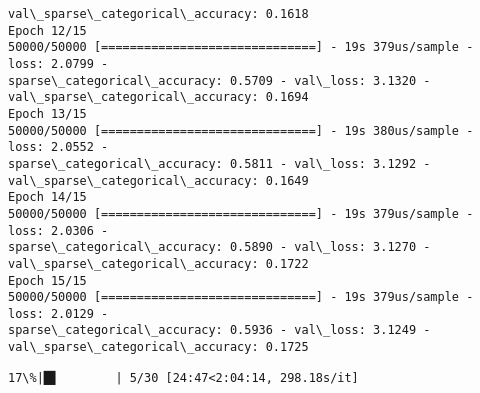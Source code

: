 \documentclass[11pt]{article}
\begin{document}
\begin{Verbatim}[commandchars=\\\{\}]
val\_sparse\_categorical\_accuracy: 0.1618
Epoch 12/15
50000/50000 [==============================] - 19s 379us/sample - loss: 2.0799 -
sparse\_categorical\_accuracy: 0.5709 - val\_loss: 3.1320 -
val\_sparse\_categorical\_accuracy: 0.1694
Epoch 13/15
50000/50000 [==============================] - 19s 380us/sample - loss: 2.0552 -
sparse\_categorical\_accuracy: 0.5811 - val\_loss: 3.1292 -
val\_sparse\_categorical\_accuracy: 0.1649
Epoch 14/15
50000/50000 [==============================] - 19s 379us/sample - loss: 2.0306 -
sparse\_categorical\_accuracy: 0.5890 - val\_loss: 3.1270 -
val\_sparse\_categorical\_accuracy: 0.1722
Epoch 15/15
50000/50000 [==============================] - 19s 379us/sample - loss: 2.0129 -
sparse\_categorical\_accuracy: 0.5936 - val\_loss: 3.1249 -
val\_sparse\_categorical\_accuracy: 0.1725
    \end{Verbatim}

    \begin{Verbatim}[commandchars=\\\{\}]
 17\%|█▋        | 5/30 [24:47<2:04:14, 298.18s/it]
    \end{Verbatim}
\end{document}
